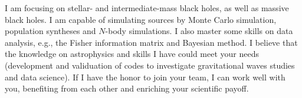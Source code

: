 \documentclass[12pt,a4paper,sans]{article}%
\begin{document}
I am focusing on stellar- and intermediate-mass black holes, as well as massive black holes. I am
capable of simulating sources by Monte Carlo simulation, population syntheses and $N$-body simulations. I also master 
some skills on data analysis, e.g., the Fisher information matrix and Bayesian method. I believe that the knowledge on
astrophysics and skills I have could meet your needs (development and validuation of codes to investigate gravitational
waves studies and data science). If I have the honor to join your team, I can work well with you, benefiting from each
other and enriching your scientific payoff. 

%
\end{document}

